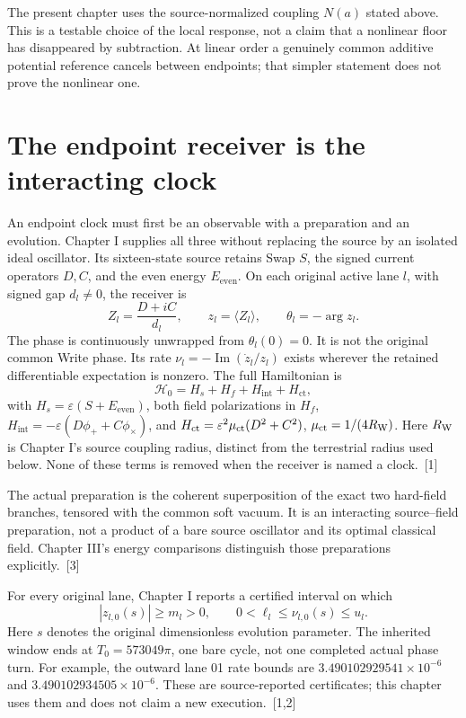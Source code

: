 \documentclass[10pt,twocolumn,letterpaper]{article}
\begin{document}
The present chapter uses the source-normalized coupling $N(a)$ stated above. This is a testable choice of the local response, not a claim that a nonlinear floor has disappeared by subtraction. At linear order a genuinely common additive potential reference cancels between endpoints; that simpler statement does not prove the nonlinear one.



\section{The endpoint receiver is the interacting clock}
An endpoint clock must first be an observable with a preparation and an evolution. Chapter I supplies all three without replacing the source by an isolated ideal oscillator. Its sixteen-state source retains Swap $S$, the signed current operators $D,C$, and the even energy $E_{\mathrm{even}}$. On each original active lane $l$, with signed gap $d_l\ne 0$, the receiver is
\[
 Z_l=\frac{D+iC}{d_l},\qquad z_l=\langle Z_l\rangle,
 \qquad\theta_l=-\arg z_l.
\]
The phase is continuously unwrapped from $\theta_l(0)=0$. It is not the original common Write phase. Its rate $\nu_l=-\operatorname{Im}(\dot z_l/z_l)$ exists wherever the retained differentiable expectation is nonzero. The full Hamiltonian is
\[
 \mathcal H_0=H_s+H_f+H_{\mathrm{int}}+H_{\mathrm{ct}},
\]
with $H_s=\varepsilon(S+E_{\mathrm{even}})$, both field polarizations in $H_f$, $H_{\mathrm{int}}=-\varepsilon(D\phi_++C\phi_\times)$, and $H_{\mathrm{ct}}=\varepsilon^2\mu_{\rm ct}(D^2+C^2)$, $\mu_{\rm ct}=1/(4R_{\rm W})$. Here $R_{\rm W}$ is Chapter I's source coupling radius, distinct from the terrestrial radius used below. None of these terms is removed when the receiver is named a clock.~[1]

The actual preparation is the coherent superposition of the exact two hard-field branches, tensored with the common soft vacuum. It is an interacting source--field preparation, not a product of a bare source oscillator and its optimal classical field. Chapter III's energy comparisons distinguish those preparations explicitly.~[3]

For every original lane, Chapter I reports a certified interval on which
\[
 |z_{l,0}(s)|\ge m_l>0,\qquad
 0<\ell_l\le\nu_{l,0}(s)\le u_l.
\]
Here $s$ denotes the original dimensionless evolution parameter. The inherited window ends at $T_0=573049\pi$, one bare cycle, not one completed actual phase turn. For example, the outward lane 01 rate bounds are $3.490102929541\times 10^{-6}$ and $3.490102934505\times 10^{-6}$. These are source-reported certificates; this chapter uses them and does not claim a new execution.~[1,2]
\end{document}
